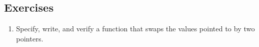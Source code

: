 \subsection*{Exercises}
\begin{enumerate}
\item
Specify, write, and verify a function that swaps the values pointed to
by two  pointers.
\end{enumerate}


